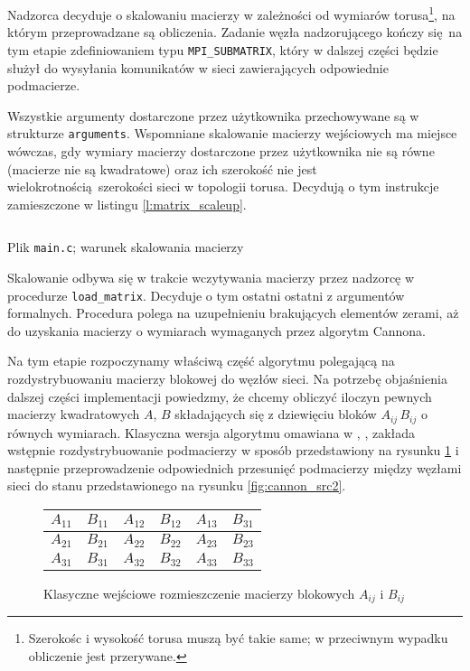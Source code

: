 Nadzorca decyduje o skalowaniu macierzy w zależności od wymiarów torusa\footnote{Szerokośc i wysokość torusa muszą być takie same; w przeciwnym wypadku obliczenie jest przerywane.}, na którym przeprowadzane są obliczenia. Zadanie węzła nadzorującego kończy się na tym etapie zdefiniowaniem typu \texttt{MPI\_SUBMATRIX}, który w dalszej części będzie służył do wysyłania komunikatów w sieci zawierających odpowiednie podmacierze.

Wszystkie argumenty dostarczone przez użytkownika przechowywane są w strukturze \texttt{arguments}. Wspomniane skalowanie macierzy wejściowych ma miejsce wówczas, gdy wymiary macierzy dostarczone przez użytkownika nie są równe (macierze nie są kwadratowe) oraz ich szerokość nie jest wielokrotnością szerokości sieci w topologii torusa. Decydują o tym instrukcje zamieszczone w listingu \ref{l:matrix_scaleup}.

\begin{listing}[H]
\inputminted[fontsize=\footnotesize,bgcolor=bg,linenos,firstnumber=408,firstline=408,lastline=418]{c}{includes/listings/main.c}
\caption{Plik \texttt{main.c}; warunek skalowania macierzy}
\label{l:matrix_scaleup}
\end{listing}

Skalowanie odbywa się w trakcie wczytywania macierzy przez nadzorcę w procedurze \texttt{load\_matrix}. Decyduje o tym ostatni ostatni z argumentów formalnych. Procedura polega na uzupełnieniu brakujących elementów zerami, aż do uzyskania macierzy o wymiarach wymaganych przez algorytm Cannona.

Na tym etapie rozpoczynamy właściwą część algorytmu polegającą na rozdystrybuowaniu macierzy blokowej do węzłów sieci. Na potrzebę objaśnienia dalszej części implementacji powiedzmy, że chcemy obliczyć iloczyn pewnych macierzy kwadratowych \(A\), \(B\) składających się z dziewięciu bloków \(A_{ij}\, B_{ij}\) o równych wymiarach. Klasyczna wersja algorytmu omawiana w \cite{Stpiczynski}, \cite{Czech}, \cite{Golub} zakłada wstępnie rozdystrybuowanie podmacierzy w sposób przedstawiony na rysunku \ref{fig:cannon_src1} i następnie przeprowadzenie odpowiednich przesunięć podmacierzy między węzłami sieci do stanu przedstawionego na rysunku  \ref{fig:cannon_src2}. 
\begin{figure}[H]
\centering
\begin{tabular}{|cc|cc|cc|}
\hline
\(A_{11}\) & \(B_{11}\) & \(A_{12}\) & \(B_{12}\) & \(A_{13}\) & \(B_{31}\) \\
\hline
\(A_{21}\) & \(B_{21}\) & \(A_{22}\) & \(B_{22}\) & \(A_{23}\) & \(B_{23}\) \\
\hline
\(A_{31}\) & \(B_{31}\) & \(A_{32}\) & \(B_{32}\) & \(A_{33}\) & \(B_{33}\) \\
\hline
\end{tabular}
\caption{Klasyczne wejściowe rozmieszczenie macierzy blokowych \(A_{ij}\) i \(B_{ij}\)} 
\label{fig:cannon_src1}
\end{figure}

